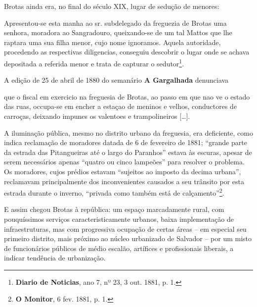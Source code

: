 Brotas ainda era, no final do século XIX, lugar de sedução de menores:

\begin{citacao}
Apresentou-se esta manha ao sr. subdelegado da freguezia de Brotas uma senhora, moradora ao Sangradouro, queixando-se de um tal Mattos que lhe raptara uma sua filha menor, cujo nome ignoramos. Aquela autoridade, procedendo as respectivas diligencias, conseguiu descobrir o lugar onde se achava depositada a referida menor e trata de capturar o sedutor\footnote{ \textbf{Diario de Noticias}, ano 7, nº 23, 3 out. 1881, p. 1.}.
\end{citacao}

A edição de 25 de abril de 1880 do semanário \textbf{A Gargalhada} denunciava

\begin{citacao}
que o fiscal em exercicio na freguesia de Brotas, ao passo em que nao ve o estado das ruas, occupa-se em encher a estaçao de meninos e velhos, conductores de carroças, deixando impunes os valentoes e trampolineiros [\dots].
\end{citacao}

A iluminação pública, mesmo no distrito urbano da freguesia, era deficiente, como indica reclamação de moradores datada de 6 de fevereiro de 1881; ``grande parte da estrada das Pitangueiras até o largo do Paranhos'' estava às escuras, apesar de serem necessários apenas ``quatro ou cinco lampeões'' para resolver o problema. Os moradores, cujos prédios estavam ``sujeitos ao imposto da decima urbana'', reclamavam principalmente dos inconvenientes causados a seu trânsito por esta estrada durante o inverno, ``privada como também está de calçamento''\footnote{\textbf{O Monitor}, 6 fev. 1881, p. 1.}.

E assim chegou Brotas à república: um espaço marcadamente rural, com pouquíssimos serviços caracteristicamente urbanos, baixa implementação de infraestruturas, mas com progressiva ocupação de certas áreas -- em especial seu primeiro distrito, mais próximo ao núcleo urbanizado de Salvador -- por um misto de funcionários públicos de médio escalão, artífices e profissionais liberais, a indicar tendência de urbanização.
